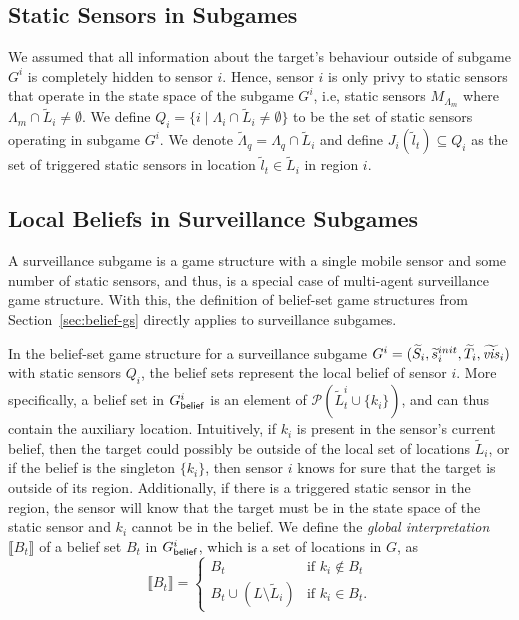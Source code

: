 \subsection{Static Sensors in Subgames}
We assumed that all information about the target's behaviour outside of subgame $G^i$ is completely  hidden to sensor $i$. Hence, sensor $i$ is only privy to static sensors that operate in the state space of the subgame $G^i$, i.e, static sensors $M_{\Lambda_m}$ where $\Lambda_m \cap \widetilde{L}_i \neq \emptyset$. We define $Q_i = \{i \mid \Lambda_{i} \cap \widetilde{L}_i \neq \emptyset\}$ to be the set of static sensors operating in subgame $G^i$. We denote $\widetilde{\Lambda}_q = \Lambda_{q} \cap \widetilde{L}_i$ and define $J_i(\widetilde l_t)\subseteq Q_i$ as the set of triggered static sensors in location $\widetilde l_t \in \widetilde L_i$ in region $i$.

\subsection{Local Beliefs in Surveillance Subgames}\label{sec:local-games}
A surveillance subgame is a game structure with a single mobile sensor and some number of static sensors, and thus, is  a special case of multi-agent surveillance game structure. With this, the definition of  belief-set game structures from Section~\ref{sec:belief-gs} directly applies to surveillance subgames.

In the belief-set game structure for a surveillance subgame $G^{i} = (\widetilde{S}_i,\widetilde{s}_i^{init},\widetilde{T}_i,\widetilde{\mathit{vis}}_i)$ with static sensors $Q_i$, the belief sets represent the local belief of sensor $i$. More specifically, a belief set in $G^{i}_{\mathsf{belief}}$ is an element of  $\mathcal{P}(\widetilde{L}^i_t \cup \{k_i\})$, and can thus contain the auxiliary location. Intuitively, if $ k_i$ is present in the sensor's current belief, then the target could possibly be outside of the local set of locations $\widetilde L_i$, or if the belief is the singleton $\{k_i\}$, then sensor $i$ knows for sure that the target is outside of its region. Additionally, if there is a triggered static sensor in the region, the sensor will know that the target must be in the state space of the static sensor and $k_i$ cannot be in the belief.
We define the \emph{global interpretation} $\llbracket B_t\rrbracket$ of a belief set $B_t$ in $G^{i}_{\mathsf{belief}}$, which is a set of locations in $G$, as
 \[\llbracket B_t\rrbracket = \begin{cases}
B_t & \text{if } k_i \not\in B_t\\
B_t \cup (L \setminus \widetilde L_i) & \text{if } k_i  \in B_t.
\end{cases}
\]

